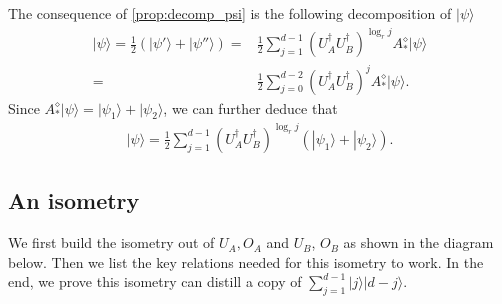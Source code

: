 \documentclass[11pt,letterpaper]{article}
\newcommand{\ket}[1]{|#1\rangle}
\newcommand{\ct}{^{\dagger}}
\newcommand{\1}{\mathbb{1}}
\theoremstyle{definition}
\begin{document}
The consequence of \cref{prop:decomp_psi} is the following decomposition of $\ket{\psi}$ 
\begin{align}
	\ket{\psi} = \frac{1}{2}(\ket{\psi'} + \ket{\psi''}) =& \frac{1}{2}\sum_{j=1}^{d-1} (U_A\ct U_B\ct)^{\log_r j} A_\ast^\diamond\ket{\psi}\\
	=& \frac{1}{2} \sum_{j=0}^{d-2} (U_A\ct U_B\ct)^j A_\ast^\diamond\ket{\psi}.
\end{align}
Since $A_\ast^\diamond \ket{\psi} = \ket{\psi_1} + \ket{\psi_2}$, we can further deduce that
\begin{align}
	\ket{\psi} =\frac{1}{2}\sum_{j=1}^{d-1} (U_A\ct U_B\ct)^{\log_r j}(\ket{\psi_1}+\ket{\psi_2}).
\end{align}


\subsection{An isometry}
\label{sec:isometry}
We first build the isometry out of $U_A, O_A$ and $U_B$, $O_B$
as shown in the diagram below.
Then we list the key relations needed for this isometry to work.
In the end, we prove this isometry can distill a copy of $\sum_{j=1}^{d-1}\ket{j}\ket{d-j}$.
\end{document}
